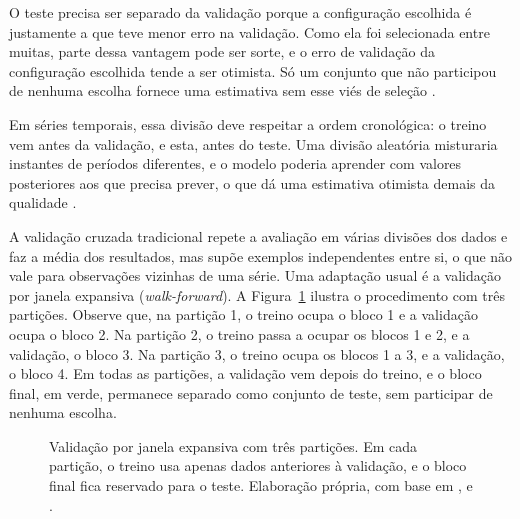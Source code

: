 O teste precisa ser separado da validação porque a configuração escolhida é justamente a que teve menor erro na validação. Como ela foi selecionada entre muitas, parte dessa vantagem pode ser sorte, e o erro de validação da configuração escolhida tende a ser otimista. Só um conjunto que não participou de nenhuma escolha fornece uma estimativa sem esse viés de seleção \cite{cawley2010overfitting}.

Em séries temporais, essa divisão deve respeitar a ordem cronológica: o treino vem antes da validação, e esta, antes do teste. Uma divisão aleatória misturaria instantes de períodos diferentes, e o modelo poderia aprender com valores posteriores aos que precisa prever, o que dá uma estimativa otimista demais da qualidade \cite{hyndman2021forecasting,tashman2000out,bergmeir2012crossvalidation}.

A validação cruzada tradicional repete a avaliação em várias divisões dos dados e faz a média dos resultados, mas supõe exemplos independentes entre si, o que não vale para observações vizinhas de uma série. Uma adaptação usual é a validação por janela expansiva (\textit{walk-forward}). A Figura~\ref{fig:validacao_walk_forward} ilustra o procedimento com três partições. Observe que, na partição 1, o treino ocupa o bloco 1 e a validação ocupa o bloco 2. Na partição 2, o treino passa a ocupar os blocos 1 e 2, e a validação, o bloco 3. Na partição 3, o treino ocupa os blocos 1 a 3, e a validação, o bloco 4. Em todas as partições, a validação vem depois do treino, e o bloco final, em verde, permanece separado como conjunto de teste, sem participar de nenhuma escolha.

\begin{figure}[htbp]
    \centering
    \caption[Validação por janela expansiva com três partições]{Validação por janela expansiva com três partições. Em cada partição, o treino usa apenas dados anteriores à validação, e o bloco final fica reservado para o teste. Elaboração própria, com base em ,  e .}
    \label{fig:validacao_walk_forward}
\end{figure}

